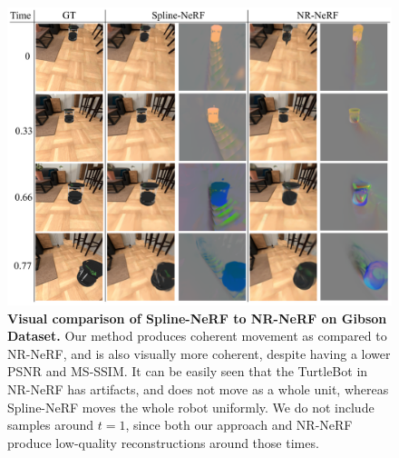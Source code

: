 \begin{figure}[!ht]
    \includegraphics[width=\textwidth]{gibson_cmp}
    \caption{
        \label{fig:gib_cmp}
        \textbf{Visual comparison of Spline-NeRF to NR-NeRF on Gibson Dataset.} Our method produces coherent movement as compared to NR-NeRF, and is also visually more coherent, despite having a lower PSNR and MS-SSIM. It can be easily seen that the TurtleBot in NR-NeRF has artifacts, and does not move as a whole unit, whereas Spline-NeRF moves the whole robot uniformly. We do not include samples around $t=1$, since both our approach and NR-NeRF produce low-quality reconstructions around those times.
    }
    \vspace{-6mm}
\end{figure}
